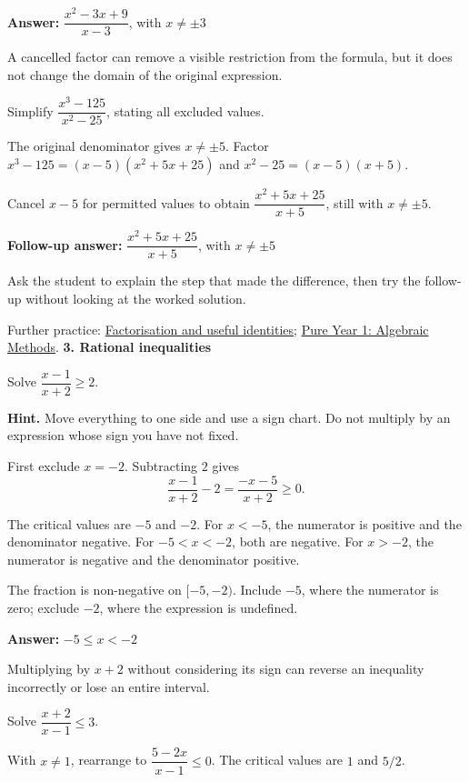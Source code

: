\documentclass[11pt,a4paper]{article}
\newcommand{\smallheading}[1]{\par\vspace{9pt}{\large\bfseries #1}\par\vspace{1pt}}
\begin{document}
\textbf{Answer:} \(\dfrac{x^2-3x+9}{x-3}\), with \(x\ne\pm3\)\par
\smallheading{What to notice}
A cancelled factor can remove a visible restriction from the formula, but it does not change the domain of the original expression.\par
\smallheading{Matched follow-up}
Simplify \(\dfrac{x^3-125}{x^2-25}\), stating all excluded values.\par
The original denominator gives \(x\ne\pm5\). Factor \(x^3-125=(x-5)(x^2+5x+25)\) and \(x^2-25=(x-5)(x+5)\).

Cancel \(x-5\) for permitted values to obtain \(\dfrac{x^2+5x+25}{x+5}\), still with \(x\ne\pm5\).

\textbf{Follow-up answer:} \(\dfrac{x^2+5x+25}{x+5}\), with \(x\ne\pm5\)\par
\vfill\smallheading{Teaching note}
Ask the student to explain the step that made the difference, then try the follow-up without looking at the worked solution.\par
{\small Further practice: \href{https://maths.arijasad.com/algebra-and-factorisation.html}{Factorisation and useful identities}; \href{https://maths.arijasad.com/edexcel-pure-year-1.html#chapter-7}{Pure Year 1: Algebraic Methods}.}
\newpage
{\LARGE\bfseries 3. Rational inequalities}\par
\smallheading{Diagnostic question}
Solve \(\dfrac{x-1}{x+2}\geq2\).\par
\textbf{Hint.} Move everything to one side and use a sign chart. Do not multiply by an expression whose sign you have not fixed.\par
\smallheading{Worked solution}
First exclude \(x=-2\). Subtracting \(2\) gives \[\frac{x-1}{x+2}-2=\frac{-x-5}{x+2}\geq0.\]

The critical values are \(-5\) and \(-2\). For \(x<-5\), the numerator is positive and the denominator negative. For \(-5<x<-2\), both are negative. For \(x>-2\), the numerator is negative and the denominator positive.

The fraction is non-negative on \([-5,-2)\). Include \(-5\), where the numerator is zero; exclude \(-2\), where the expression is undefined.

\textbf{Answer:} \(-5\leq x<-2\)\par
\smallheading{What to notice}
Multiplying by \(x+2\) without considering its sign can reverse an inequality incorrectly or lose an entire interval.\par
\smallheading{Matched follow-up}
Solve \(\dfrac{x+2}{x-1}\leq3\).\par
With \(x\ne1\), rearrange to \(\dfrac{5-2x}{x-1}\leq0\). The critical values are \(1\) and \(5/2\).
\end{document}
